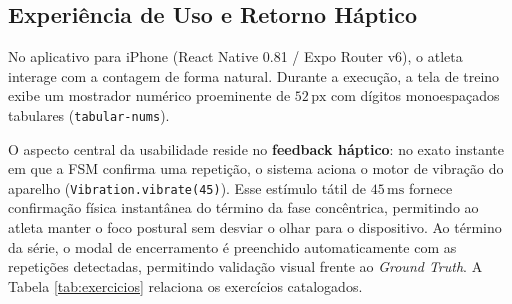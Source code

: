 \documentclass[12pt]{article}
\begin{document}
\begin{table}[ht]
\centering
\caption{Esquema Resumido do Banco de Dados Local SQLite}
\label{tab:esquema_sqlite}
\small
{}
\end{table}

\subsection{Experiência de Uso e Retorno Háptico}

No aplicativo para iPhone (React Native 0.81 / Expo Router v6), o atleta interage com a contagem de forma natural. Durante a execução, a tela de treino exibe um mostrador numérico proeminente de $52\,\text{px}$ com dígitos monoespaçados tabulares (\texttt{tabular-nums}).

O aspecto central da usabilidade reside no \textbf{feedback háptico}: no exato instante em que a FSM confirma uma repetição, o sistema aciona o motor de vibração do aparelho (\texttt{Vibration.vibrate(45)}). Esse estímulo tátil de $45\,\text{ms}$ fornece confirmação física instantânea do término da fase concêntrica, permitindo ao atleta manter o foco postural sem desviar o olhar para o dispositivo. Ao término da série, o modal de encerramento é preenchido automaticamente com as repetições detectadas, permitindo validação visual frente ao \textit{Ground Truth}. A Tabela \ref{tab:exercicios} relaciona os exercícios catalogados.
\end{document}
